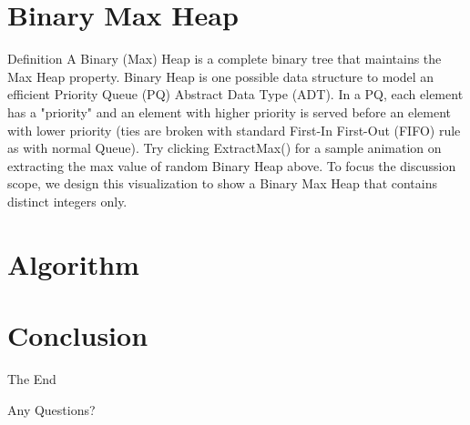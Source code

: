 \documentclass{beamer}
\begin{document}
\section{Binary Max Heap}
\begin{frame}{Definition}
  A Binary (Max) Heap is a complete binary tree that maintains the Max Heap property.
  Binary Heap is one possible data structure to model an efficient Priority Queue (PQ) Abstract Data Type (ADT). In a PQ, each element has a "priority" and an element with higher priority is served before an element with lower priority (ties are broken with standard First-In First-Out (FIFO) rule as with normal Queue). Try clicking ExtractMax() for a sample animation on extracting the max value of random Binary Heap above.
  To focus the discussion scope, we design this visualization to show a Binary Max Heap that contains distinct integers only.
\end{frame}


\section{Algorithm}



\section{Conclusion}
\begin{frame}{The End}
  \begin{center}
    Any Questions?
  \end{center}
\end{frame}
\end{document}
